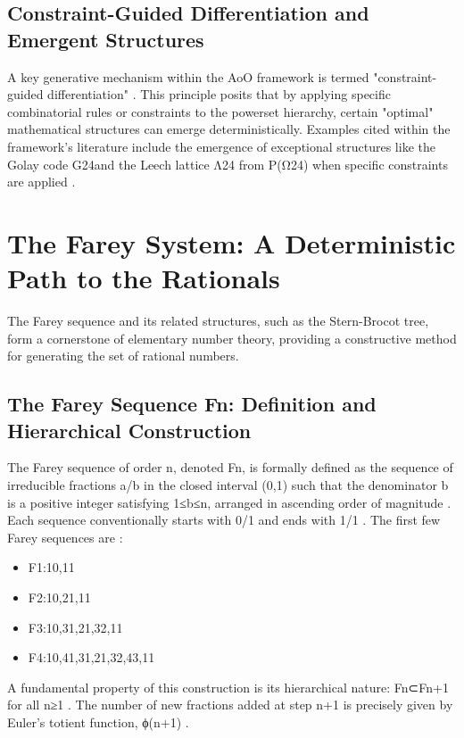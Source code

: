 \documentclass[12pt,a4paper]{article}
\theoremstyle{definition}
\theoremstyle{remark}
\begin{document}
\subsection{Constraint-Guided Differentiation and Emergent Structures}
A key generative mechanism within the AoO framework is termed "constraint-guided differentiation" \cite{ElKhettabi2025AoO}. This principle posits that by applying specific combinatorial rules or constraints to the powerset hierarchy, certain "optimal" mathematical structures can emerge deterministically. Examples cited within the framework's literature include the emergence of exceptional structures like the Golay code G24​ and the Leech lattice Λ24​ from P(Ω24​) when specific constraints are applied \cite{ElKhettabi2025AoO}.
\section{The Farey System: A Deterministic Path to the Rationals}
The Farey sequence and its related structures, such as the Stern-Brocot tree, form a cornerstone of elementary number theory, providing a constructive method for generating the set of rational numbers.
\subsection{The Farey Sequence Fn​: Definition and Hierarchical Construction}
The Farey sequence of order n, denoted Fn​, is formally defined as the sequence of irreducible fractions a/b in the closed interval (0,1) such that the denominator b is a positive integer satisfying 1≤b≤n, arranged in ascending order of magnitude \cite{WikipediaFarey, Zukin2016}. Each sequence conventionally starts with 0/1 and ends with 1/1 \cite{WikipediaFarey}.
The first few Farey sequences are \cite{Zukin2016, RanickiFareyProject}:
\begin{itemize}
\item F1​:{10​,11​}
\item F2​:{10​,21​,11​}
\item F3​:{10​,31​,21​,32​,11​}
\item F4​:{10​,41​,31​,21​,32​,43​,11​}
\end{itemize}
A fundamental property of this construction is its hierarchical nature: Fn​⊂Fn+1​ for all n≥1 \cite{WikipediaFarey, Zukin2016}. The number of new fractions added at step n+1 is precisely given by Euler's totient function, ϕ(n+1) \cite{WikipediaFarey, Zukin2016}.
\end{document}
